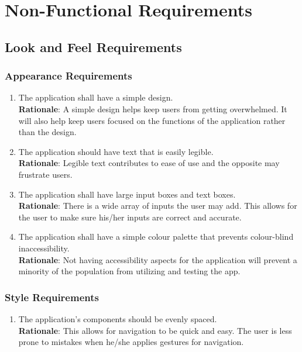 \section{Non-Functional Requirements}
\label{sec:non-functional_requirements}


\subsection{Look and Feel Requirements}
\label{sub:look_and_feel_requirements}


\subsubsection{Appearance Requirements}
\label{ssub:appearance_requirements}
\begin{enumerate}[{LF-A}1. ]
	\item The application shall have a simple design.
	\\ \textbf{Rationale}: A simple design helps keep users from getting overwhelmed. It will also help keep users focused on the 
	functions of the application rather than the design.
	\item The application should have text that is easily legible.
	\\ \textbf{Rationale}: Legible text contributes to ease of use and the opposite may frustrate users.
	\item The application shall have large input boxes and text boxes.
	\\ \textbf{Rationale}: There is a wide array of inputs the user may add. This allows for the user to make sure his/her inputs are correct and accurate.
	\item The application shall have a simple colour palette that prevents colour-blind inaccessibility.
	\\ \textbf{Rationale}: Not having accessibility aspects for the application will prevent a minority of the population from utilizing and testing the app.  
\end{enumerate}


\subsubsection{Style Requirements}
\label{ssub:style_requirements}
\begin{enumerate}[{LF-S}1. ]
	\item The application’s components should be evenly spaced.
	\\ \textbf{Rationale}: This allows for navigation to be quick and easy. The user is less prone to mistakes when he/she applies gestures for navigation.
\end{enumerate}

